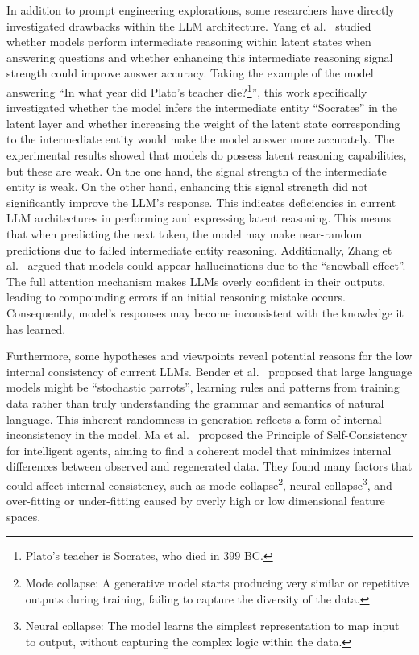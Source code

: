 \documentclass[lettersize,journal]{IEEEtran}
\begin{document}
In addition to prompt engineering explorations, some researchers have directly investigated drawbacks within the LLM architecture. Yang et al.~\cite{TheoryLatentReason_24_arXiv_Google} studied whether models perform intermediate reasoning within latent states when answering questions and whether enhancing this intermediate reasoning signal strength could improve answer accuracy. Taking the example of the model answering ``In what year did Plato's teacher die?\footnote{Plato's teacher is Socrates, who died in 399 BC.}'', this work specifically investigated whether the model infers the intermediate entity ``Socrates'' in the latent layer and whether increasing the weight of the latent state corresponding to the intermediate entity would make the model answer more accurately. The experimental results showed that models do possess latent reasoning capabilities, but these are weak. On the one hand, the signal strength of the intermediate entity is weak. On the other hand, enhancing this signal strength did not significantly improve the LLM's response. This indicates deficiencies in current LLM architectures in performing and expressing latent reasoning. This means that when predicting the next token, the model may make near-random predictions due to failed intermediate entity reasoning. Additionally, Zhang et al.~\cite{TheorySnowball_23_arXiv_NYU} argued that models could appear hallucinations due to the ``snowball effect''. The full attention mechanism makes LLMs overly confident in their outputs, leading to compounding errors if an initial reasoning mistake occurs. Consequently, model's responses may become inconsistent with the knowledge it has learned.

Furthermore, some hypotheses and viewpoints reveal potential reasons for the low internal consistency of current LLMs. Bender et al.~\cite{Parrots_21_FAccT_UoW} proposed that large language models might be ``stochastic parrots'', learning rules and patterns from training data rather than truly understanding the grammar and semantics of natural language. This inherent randomness in generation reflects a form of internal inconsistency in the model. Ma et al.~\cite{PrincipleSC_22_FITEE} proposed the Principle of Self-Consistency for intelligent agents, aiming to find a coherent model that minimizes internal differences between observed and regenerated data. They found many factors that could affect internal consistency, such as mode collapse\footnote{Mode collapse: A generative model starts producing very similar or repetitive outputs during training, failing to capture the diversity of the data.}, neural collapse\footnote{Neural collapse: The model learns the simplest representation to map input to output, without capturing the complex logic within the data.}, and over-fitting or under-fitting caused by overly high or low dimensional feature spaces.
\end{document}
